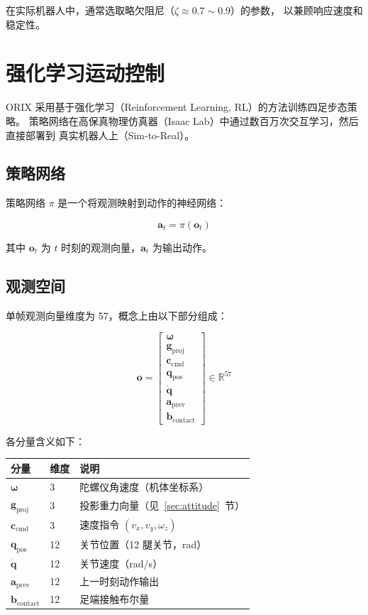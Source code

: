 \documentclass[a4paper,11pt,openany]{book}
\begin{document}
在实际机器人中，通常选取略欠阻尼（$\zeta \approx 0.7 \sim 0.9$）的参数，
以兼顾响应速度和稳定性。

\section{强化学习运动控制}
\label{sec:rl-locomotion}

ORIX 采用基于强化学习（Reinforcement Learning, RL）的方法训练四足步态策略。
策略网络在高保真物理仿真器（Isaac Lab）中通过数百万次交互学习，然后直接部署到
真实机器人上（Sim-to-Real）。

\subsection{策略网络}

策略网络 $\pi$ 是一个将观测映射到动作的神经网络：

\begin{equation}
\mathbf{a}_t = \pi(\mathbf{o}_t)
\end{equation}

其中 $\mathbf{o}_t$ 为 $t$ 时刻的观测向量，$\mathbf{a}_t$ 为输出动作。

\subsection{观测空间}

单帧观测向量维度为 57，概念上由以下部分组成：

\begin{equation}
\mathbf{o} = \begin{bmatrix}
  \boldsymbol{\omega} \\ \mathbf{g}_{\mathrm{proj}} \\ \mathbf{c}_{\mathrm{cmd}} \\
  \mathbf{q}_{\mathrm{pos}} \\ \dot{\mathbf{q}} \\ \mathbf{a}_{\mathrm{prev}} \\
  \mathbf{b}_{\mathrm{contact}}
\end{bmatrix}
\in \mathbb{R}^{57}
\end{equation}

各分量含义如下：

\begin{longtable}{llp{7.5cm}}
\toprule
分量 & 维度 & 说明 \\
\midrule
$\boldsymbol{\omega}$ & 3 & 陀螺仪角速度（机体坐标系） \\
$\mathbf{g}_{\mathrm{proj}}$ & 3 & 投影重力向量（见~\ref{sec:attitude}~节） \\
$\mathbf{c}_{\mathrm{cmd}}$ & 3 & 速度指令 $(v_x, v_y, \omega_z)$ \\
$\mathbf{q}_{\mathrm{pos}}$ & 12 & 关节位置（12 腿关节，rad） \\
$\dot{\mathbf{q}}$ & 12 & 关节速度（rad/s） \\
$\mathbf{a}_{\mathrm{prev}}$ & 12 & 上一时刻动作输出 \\
$\mathbf{b}_{\mathrm{contact}}$ & 12 & 足端接触布尔量 \\
\bottomrule
\end{longtable}
\end{document}
